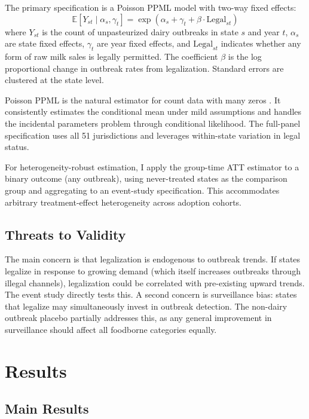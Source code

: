 \documentclass[12pt]{article}
\newcommand{\E}{\mathbb{E}}
\begin{document}
The primary specification is a Poisson PPML model with two-way fixed effects:
\begin{equation}
\E[Y_{st} \mid \alpha_s, \gamma_t] = \exp(\alpha_s + \gamma_t + \beta \cdot \text{Legal}_{st})
\label{eq:poisson}
\end{equation}
where $Y_{st}$ is the count of unpasteurized dairy outbreaks in state $s$ and year $t$, $\alpha_s$ are state fixed effects, $\gamma_t$ are year fixed effects, and $\text{Legal}_{st}$ indicates whether any form of raw milk sales is legally permitted. The coefficient $\beta$ is the log proportional change in outbreak rates from legalization. Standard errors are clustered at the state level.

Poisson PPML is the natural estimator for count data with many zeros \citep{Santos2006}. It consistently estimates the conditional mean under mild assumptions and handles the incidental parameters problem through conditional likelihood. The full-panel specification uses all 51 jurisdictions and leverages within-state variation in legal status.

For heterogeneity-robust estimation, I apply the \citet{Callaway2021} group-time ATT estimator to a binary outcome (any outbreak), using never-treated states as the comparison group and aggregating to an event-study specification. This accommodates arbitrary treatment-effect heterogeneity across adoption cohorts.

\subsection{Threats to Validity}

The main concern is that legalization is endogenous to outbreak trends. If states legalize in response to growing demand (which itself increases outbreaks through illegal channels), legalization could be correlated with pre-existing upward trends. The event study directly tests this. A second concern is surveillance bias: states that legalize may simultaneously invest in outbreak detection. The non-dairy outbreak placebo partially addresses this, as any general improvement in surveillance should affect all foodborne categories equally.


\section{Results}

\subsection{Main Results}
\end{document}
